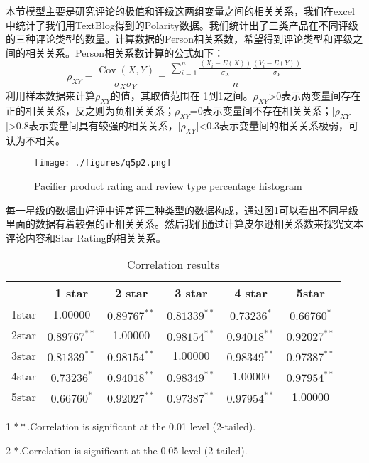 \documentclass[UTF8]{article}
\newcommand{\upcite}[1]{\textsuperscript{\textsuperscript{\cite{#1}}}}
\begin{document}
本节模型主要是研究评论的极值和评级这两组变量之间的相关关系，我们在excel中统计了我们用TextBlog得到的Polarity数据。我们统计出了三类产品在不同评级的三种评论类型的数量。计算数据的Person相关系数，希望得到评论类型和评级之间的相关关系。Person相关系数计算的公式如下：
\begin{equation}\rho_{X Y}=\frac{\operatorname{Cov}(X, Y)}{\sigma_{X} \sigma_{Y}}=\frac{\sum_{i=1}^{n} \frac{\left(X_{i}-E(X)\right)}{\sigma_{X}} \frac{\left(Y_{i}-E(Y)\right)}{\sigma_{Y}}}{n}
\end{equation}
利用样本数据来计算$\rho_{X Y}$的值，其取值范围在-1到1之间。$\rho_{XY}$>0表示两变量间存在正的相关关系，反之则为负相关关系；$\rho_{XY}$=0表示变量间不存在相关关系；|$\rho_{XY}$|>0.8表示变量间具有较强的相关关系，|$\rho_{XY}$|<0.3表示变量间的相关关系极弱，可认为不相关\upcite{w2}。

\begin{figure}[H]
	\centering
	\texttt{[image: ./figures/q5p2.png]}
	\caption{Pacifier product rating and review type percentage histogram} \label{q5p2}
\end{figure}

每一星级的数据由好评中评差评三种类型的数据构成，通过图\ref{q5p2}可以看出不同星级里面的数据有着较强的正相关关系。然后我们通过计算皮尔逊相关系数来探究文本评论内容和Star Rating的相关关系。

\begin{table}[H]
	\caption{Correlation results}\label{q5b1}
	\centering
	\begin{threeparttable}
	\begin{tabular}{c|ccccc}
		\hline & 1 star & 2 star & 3 star & 4 star & 5star \\
		\hline 1star & 1.00000 & $0.89767^{* *}$ & $0.81339^{* *}$ & $0.73236^{*}$ & $0.66760^{*}$ \\
		2star & $0.89767^{* *}$ & 1.00000 & $0.98154^{* *}$ & $0.94018^{* *}$ & $0.92027^{* *}$ \\
		3star & $0.81339^{* *}$ & $0.98154^{* *}$ & 1.00000 & $0.98349^{* *}$ & $0.97387^{* *}$ \\
		4star & $0.73236^{*}$ & $0.94018^{* *}$ & $0.98349^{* *}$ & 1.00000 & $0.97954^{* *}$ \\
		5star & $0.66760^{*}$ & $0.92027^{* *}$ & $0.97387^{* *}$ & $0.97954^{* *}$ & 1.00000 \\
		\hline								
	\end{tabular}
\begin{tablenotes}
	\footnotesize
	\item[1] \(* *.\)Correlation is significant at the 0.01 level (2-tailed). 
	\item[2] \(*.\)Correlation is significant at the 0.05 level (2-tailed).
\end{tablenotes}
\end{threeparttable}
\end{table}
\end{document}
